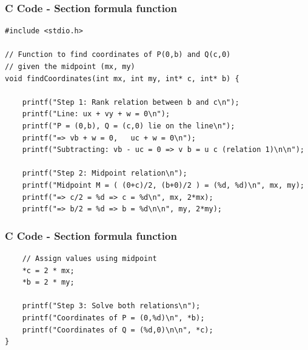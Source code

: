 \documentclass{beamer}
\begin{document}
\begin{frame}[fragile]
\frametitle{C Code - Section formula function}
\begin{lstlisting}
#include <stdio.h>

// Function to find coordinates of P(0,b) and Q(c,0)
// given the midpoint (mx, my)
void findCoordinates(int mx, int my, int* c, int* b) {

    printf("Step 1: Rank relation between b and c\n");
    printf("Line: ux + vy + w = 0\n");
    printf("P = (0,b), Q = (c,0) lie on the line\n");
    printf("=> vb + w = 0,   uc + w = 0\n");
    printf("Subtracting: vb - uc = 0 => v b = u c (relation 1)\n\n");

    printf("Step 2: Midpoint relation\n");
    printf("Midpoint M = ( (0+c)/2, (b+0)/2 ) = (%d, %d)\n", mx, my);
    printf("=> c/2 = %d => c = %d\n", mx, 2*mx);
    printf("=> b/2 = %d => b = %d\n\n", my, 2*my);
    \end{lstlisting}
\end{frame}

\begin{frame}[fragile]
\frametitle{C Code - Section formula function}
\begin{lstlisting}
    // Assign values using midpoint
    *c = 2 * mx;
    *b = 2 * my;

    printf("Step 3: Solve both relations\n");
    printf("Coordinates of P = (0,%d)\n", *b);
    printf("Coordinates of Q = (%d,0)\n\n", *c);
}

\end{lstlisting}
\end{frame}
\end{document}
